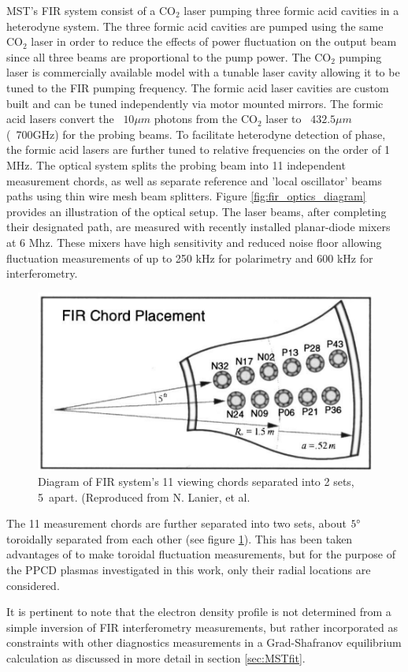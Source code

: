 MST's FIR system consist of a CO$_2$ laser pumping three formic acid cavities in a heterodyne system. The three formic acid cavities are pumped using the same CO$_2$ laser in order to reduce the effects of power fluctuation on the output beam since all three beams are proportional to the pump power. The CO$_2$ pumping laser is commercially available model with a tunable laser cavity allowing it to be tuned to the FIR pumping frequency. The formic acid laser cavities are custom built and can be tuned independently via motor mounted mirrors. The formic acid lasers convert the ~$10\mu m$ photons from the CO$_2$ laser to ~$432.5\mu m$ (~700GHz) for the probing beams. To facilitate heterodyne detection of phase, the formic acid lasers are further tuned to relative frequencies on the order of 1 MHz. The optical system splits the probing beam into 11 independent measurement chords, as well as separate reference and 'local oscillator' beams paths using thin wire mesh beam splitters. Figure \ref{fig:fir_optics_diagram} provides an illustration of the optical setup. The laser beams, after completing their designated path, are measured with recently installed planar-diode mixers at 6 Mhz. These mixers have high sensitivity and reduced noise floor allowing fluctuation measurements of up to 250 kHz for polarimetry and 600 kHz for interferometry\cite{Parke2016}. 
\begin{figure}[!htb]
	\centering
	\includegraphics[width = 0.75\linewidth]{./implementation/fir_chords.PNG}

	\caption[Diagram of FIR chord offset]{Diagram of FIR system's 11 viewing chords separated into 2 sets, 5\textdegree\ apart. (Reproduced from N. Lanier, et al.\cite{Lanier2001}}	
	\label{fig:fir_chords}
\end{figure}

The 11 measurement chords are further separated into two sets, about $5\degree$ toroidally separated from each other (see figure \ref{fig:fir_chords}). This has been taken advantages of to make toroidal fluctuation measurements, but for the purpose of the PPCD plasmas investigated in this work, only their radial locations are considered. 

It is pertinent to note that the electron density profile is not determined from a simple inversion of FIR interferometry measurements, but rather incorporated as constraints with other diagnostics measurements in a Grad-Shafranov equilibrium calculation \cite{Anderson2001} as discussed in more detail in section \ref{sec:MSTfit}.